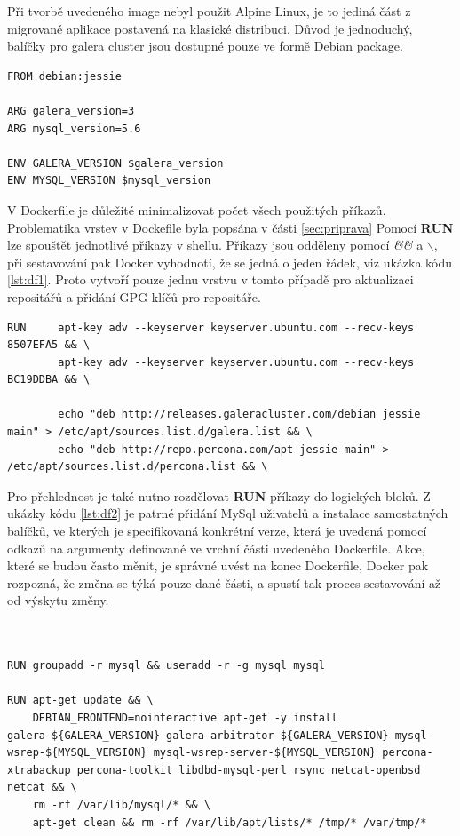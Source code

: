 Při tvorbě uvedeného image nebyl použit Alpine Linux, je to jediná část z migrované aplikace postavená na klasické distribuci. Důvod je jednoduchý, balíčky pro galera cluster jsou dostupné pouze ve formě Debian package.

\begin{lstlisting}[caption={Dockerfile, část 1.},label= {lst:df1}]
FROM debian:jessie

ARG galera_version=3
ARG mysql_version=5.6

ENV GALERA_VERSION $galera_version
ENV MYSQL_VERSION $mysql_version

\end{lstlisting}


V Dockerfile je důležité minimalizovat počet všech použitých příkazů. Problematika vrstev v Dockefile byla popsána v části \ref{sec:priprava} Pomocí  \textbf{RUN} lze spouštět jednotlivé příkazy v shellu. Příkazy jsou odděleny pomocí \textit{\&\&} a \textit{$\backslash$}, při sestavování pak Docker vyhodnotí, že se jedná o jeden řádek, viz ukázka kódu \ref{lst:df1}. Proto vytvoří pouze jednu vrstvu v tomto případě pro aktualizaci repositářů a přidání GPG klíčů pro repositáře.

\begin{lstlisting}[caption={Seznam podů po nainstalovaní Kuberentes},label= {lst:pods}]
RUN     apt-key adv --keyserver keyserver.ubuntu.com --recv-keys 8507EFA5 && \
        apt-key adv --keyserver keyserver.ubuntu.com --recv-keys BC19DDBA && \

        echo "deb http://releases.galeracluster.com/debian jessie main" > /etc/apt/sources.list.d/galera.list && \
        echo "deb http://repo.percona.com/apt jessie main" > /etc/apt/sources.list.d/percona.list && \

\end{lstlisting}

Pro přehlednost je také nutno rozdělovat \textbf{RUN} příkazy do logických bloků. Z ukázky kódu \ref{lst:df2} je patrné přidání MySql uživatelů a instalace samostatných balíčků, ve kterých je specifikovaná konkrétní verze, která je uvedená pomocí odkazů na argumenty definované ve vrchní části uvedeného Dockerfile. Akce, které se budou často měnit, je správné uvést na konec Dockerfile, Docker pak rozpozná, že změna se týká pouze dané části, a spustí tak proces sestavování až od výskytu změny.

\begin{lstlisting}[caption={Dockerfile, část 2},label= {lst:df2}]


RUN groupadd -r mysql && useradd -r -g mysql mysql

RUN apt-get update && \
    DEBIAN_FRONTEND=nointeractive apt-get -y install galera-${GALERA_VERSION} galera-arbitrator-${GALERA_VERSION} mysql-wsrep-${MYSQL_VERSION} mysql-wsrep-server-${MYSQL_VERSION} percona-xtrabackup percona-toolkit libdbd-mysql-perl rsync netcat-openbsd netcat && \
    rm -rf /var/lib/mysql/* && \
    apt-get clean && rm -rf /var/lib/apt/lists/* /tmp/* /var/tmp/*
\end{lstlisting}

